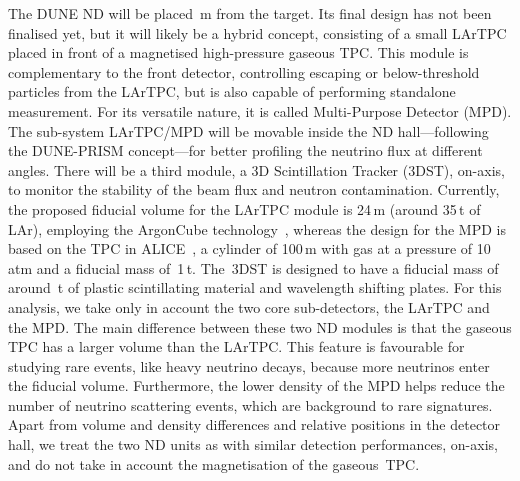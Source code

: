 The DUNE ND will be placed \,m from the target.
Its final design has not been finalised yet, but it will likely be a hybrid concept, %
consisting of a small LArTPC placed in front of a magnetised high-pressure gaseous TPC.
This module is complementary to the front detector, controlling escaping or below-threshold particles from the LArTPC, %
but is also capable of performing standalone measurement.
For its versatile nature, it is called Multi-Purpose Detector (MPD).
The sub-system LArTPC/MPD will be movable inside the ND hall---following the DUNE-PRISM concept---for better profiling the neutrino flux %
at different angles.
There will be a third module, a 3D Scintillation Tracker (3DST), on-axis, to monitor %
the stability of the beam flux and neutron contamination.
Currently, the proposed fiducial volume for the LArTPC module is 24\,m (around 35\,t of LAr), employing the ArgonCube technology~\cite{Amsler:1993255}, %
whereas the design for the MPD is based on the TPC in \mbox{ALICE}~\cite{Glassel:2004jv}, %
a cylinder of 100\,m with gas at a pressure of 10\,atm and a fiducial mass of~1\,t.
The~3DST is designed to have a fiducial mass of around \,t of plastic scintillating material and %
wavelength shifting plates.
For this analysis, we take only in account the two core sub-detectors, the LArTPC and the MPD.
The main difference between these two ND modules is that the gaseous TPC has a larger volume than the LArTPC.
This feature is favourable for studying rare events, like heavy neutrino decays, because more neutrinos enter the fiducial volume.
Furthermore, the lower density of the MPD helps reduce the number of neutrino scattering events, which are background to rare signatures.
Apart from volume and density differences and relative positions in the detector hall, %
we treat the two ND units as with similar detection performances, on-axis, and do not take in account the magnetisation of the gaseous~TPC. 

